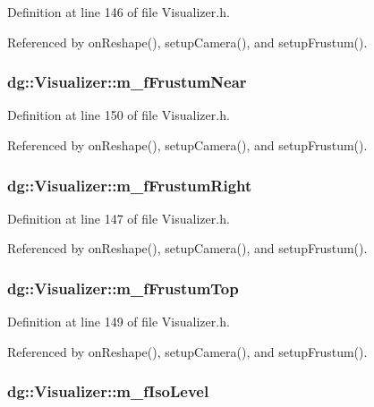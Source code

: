 Definition at line 146 of file Visualizer.h.

Referenced by on\-Reshape(), setup\-Camera(), and setup\-Frustum().
\subsubsection{ dg::Visualizer::m\_\-f\-Frustum\-Near\hspace{0.3cm}{\tt  [protected]}}\label{classdg_1_1Visualizer_n40}




Definition at line 150 of file Visualizer.h.

Referenced by on\-Reshape(), setup\-Camera(), and setup\-Frustum().
\subsubsection{ dg::Visualizer::m\_\-f\-Frustum\-Right\hspace{0.3cm}{\tt  [protected]}}\label{classdg_1_1Visualizer_n37}




Definition at line 147 of file Visualizer.h.

Referenced by on\-Reshape(), setup\-Camera(), and setup\-Frustum().
\subsubsection{ dg::Visualizer::m\_\-f\-Frustum\-Top\hspace{0.3cm}{\tt  [protected]}}\label{classdg_1_1Visualizer_n39}




Definition at line 149 of file Visualizer.h.

Referenced by on\-Reshape(), setup\-Camera(), and setup\-Frustum().
\subsubsection{ dg::Visualizer::m\_\-f\-Iso\-Level\hspace{0.3cm}{\tt  [protected]}}\label{classdg_1_1Visualizer_n25}




